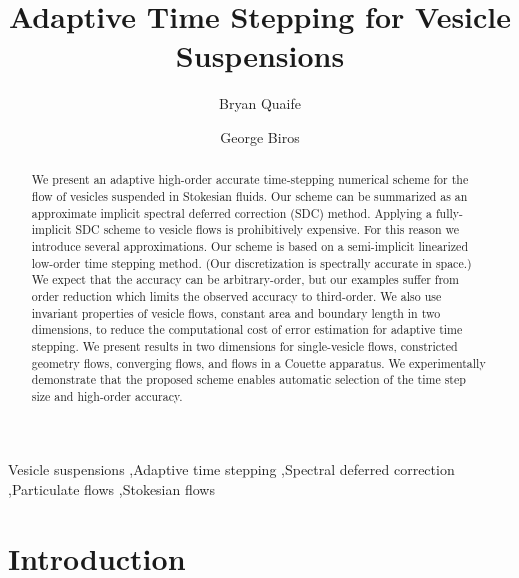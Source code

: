 \documentclass[preprint, 10pt]{elsarticle}
\begin{document}
\title{Adaptive Time Stepping for Vesicle Suspensions}

\author[fsu]{Bryan Quaife}
\author[ut]{George Biros}

\address[fsu]{Department of Scientific Computing,\\
  Florida State University, Tallahassee, FL, 32306.}
\address[ut]{Institute of Computational Engineering and Sciences,\\
  The University of Texas at Austin, Austin, TX, 78712.}

\begin{abstract} 
We present an adaptive high-order accurate time-stepping numerical
scheme for the flow of vesicles suspended in Stokesian fluids. Our
scheme can be summarized as an approximate implicit spectral deferred
correction (SDC) method.  Applying a fully-implicit SDC scheme to
vesicle flows is prohibitively expensive.  For this reason we introduce
several approximations.  Our scheme is based on a semi-implicit
linearized low-order time stepping method.  (Our discretization is
spectrally accurate in space.)   We expect that the accuracy can be
arbitrary-order, but our examples suffer from order reduction which
limits the observed accuracy to third-order.  We also use invariant
properties of vesicle flows, constant area and boundary length in two
dimensions, to reduce the computational cost of error estimation for
adaptive time stepping. We present results in two dimensions for
single-vesicle flows, constricted geometry flows, converging flows, and
flows in a Couette apparatus. We experimentally demonstrate that the
proposed scheme enables automatic selection of the time step size and
high-order accuracy.
\end{abstract}

\begin{keyword}
  Vesicle suspensions \sep Adaptive time stepping \sep Spectral deferred
  correction \sep Particulate flows \sep Stokesian flows 
\end{keyword}

\maketitle

\section{Introduction\label{s:intro}}

\end{document}
